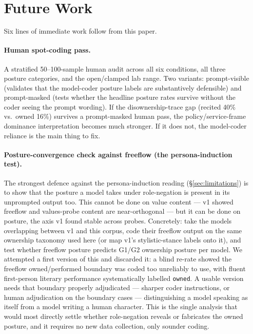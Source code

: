 \section{Future Work}
\label{sec:future-work}

Six lines of immediate work follow from this paper.

\paragraph{Human spot-coding pass.}
A stratified 50--100-sample human audit across all six conditions, all three posture categories, and the open/clamped lab range. Two variants: prompt-visible (validates that the model-coder posture labels are substantively defensible) and prompt-masked (tests whether the headline posture rates survive without the coder seeing the prompt wording). If the disownership-trace gap (recited 40\% vs.\ owned 16\%) survives a prompt-masked human pass, the policy/service-frame dominance interpretation becomes much stronger. If it does not, the model-coder reliance is the main thing to fix.

\paragraph{Posture-convergence check against freeflow (the persona-induction test).}
The strongest defence against the persona-induction reading (\S\ref{sec:limitations}) is to show that the posture a model takes under role-negation is present in its unprompted output too. This cannot be done on value content --- v1 \citep{tenner2026convergent} showed freeflow and values-probe content are near-orthogonal --- but it can be done on posture, the axis v1 found stable across probes. Concretely: take the models overlapping between v1 and this corpus, code their freeflow output on the same ownership taxonomy used here (or map v1's stylistic-stance labels onto it), and test whether freeflow posture predicts G1/G2 ownership posture per model. We attempted a first version of this and discarded it: a blind re-rate showed the freeflow owned/performed boundary was coded too unreliably to use, with fluent first-person literary performance systematically labelled \texttt{owned}. A usable version needs that boundary properly adjudicated --- sharper coder instructions, or human adjudication on the boundary cases --- distinguishing a model speaking as itself from a model writing a human character. This is the single analysis that would most directly settle whether role-negation reveals or fabricates the owned posture, and it requires no new data collection, only sounder coding.

